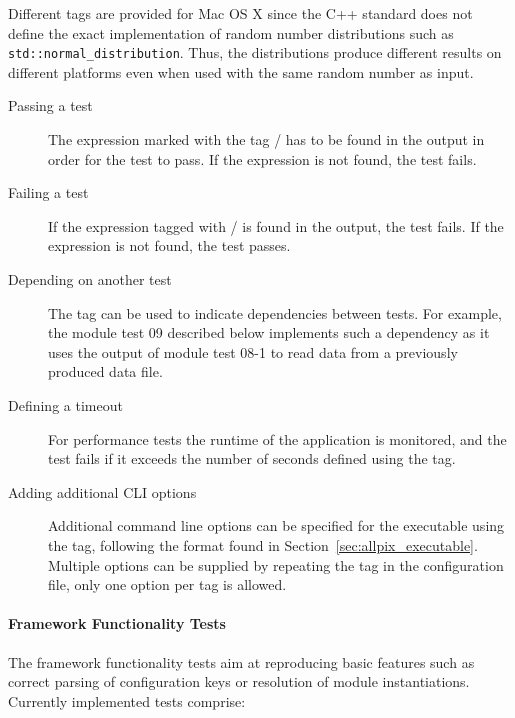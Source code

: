 Different tags are provided for Mac OS X since the C++ standard does not define the exact implementation of random number distributions such as \texttt{std::normal\_distribution}.
Thus, the distributions produce different results on different platforms even when used with the same random number as input.

\begin{description}
  \item[Passing a test] The expression marked with the tag / has to be found in the output in order for the test to pass. If the expression is not found, the test fails.
  \item[Failing a test] If the expression tagged with / is found in the output, the test fails. If the expression is not found, the test passes.
  \item[Depending on another test] The tag  can be used to indicate dependencies between tests. For example, the module test 09 described below implements such a dependency as it uses the output of module test 08-1 to read data from a previously produced \apsq data file.
  \item[Defining a timeout] For performance tests the runtime of the application is monitored, and the test fails if it exceeds the number of seconds defined using the  tag.
  \item[Adding additional CLI options] Additional command line options can be specified for the  executable using the  tag, following the format found in Section~\ref{sec:allpix_executable}. Multiple options can be supplied by repeating the  tag in the configuration file, only one option per tag is allowed.
\end{description}

\paragraph{Framework Functionality Tests}

The framework functionality tests aim at reproducing basic features such as correct parsing of configuration keys or resolution of module instantiations.
Currently implemented tests comprise:

